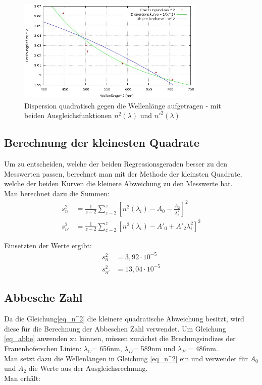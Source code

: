 \begin{figure}[htbp]
\includegraphics[width=0.8\textwidth]{pics/kurve.jpeg}
\caption{Dispersion quadratisch gegen die Wellenlänge aufgetragen - mit beiden Ausgleichsfunktionen $n^2(\lambda)$ und $n'^2(\lambda)$}
\label{kurve}
\end{figure}

\subsection{Berechnung der kleinesten Quadrate}
Um zu entscheiden, welche der beiden Regressionsgeraden besser zu den Messwerten passen, berechnet man mit der Methode der kleinsten Quadrate, welche der beiden Kurven die kleinere Abweichung zu den Messwerte hat.\\
Man berechnet dazu die Summen:
\begin{align}
s^2_n &= \frac{1}{z-2}\sum^z_{z-2}\left[n^2(\lambda_i) - A_0 - \frac{A_2}{\lambda^2_i}\right]^2\\
s^2_{n'} &= \frac{1}{z-2}\sum^z_{z-2}\left[n^2(\lambda_i) - A'_0 +A'_2\lambda^2_i\right]^2
\end{align}

Einsetzten der Werte ergibt:
\begin{align*}
s^2_n &=3,92 \cdot10^{-5}\\
s^2_{n'}&=13,04\cdot10^{-5}
\end{align*}

\subsection{Abbesche Zahl}
Da die Gleichung\eqref{eq_n^2} die kleinere quadratische Abweichung besitzt, wird diese für die Berechnung der Abbeschen Zahl verwendet. Um Gleichung \eqref{eq_abbe} anwenden zu können, müssen zunächst die Brechungsindizes der  Frauenhoferschen Linien: $\lambda_C$= 656nm, $\lambda_D$= 589nm und $\lambda_F$ = 486nm.\\
Man setzt dazu die Wellenlängen in Gleichung \eqref{eq_n^2} ein und verwendet für $A_0$ und $A_2$ die Werte aus der Ausgleichsrechnung.\\
Man erhält:

